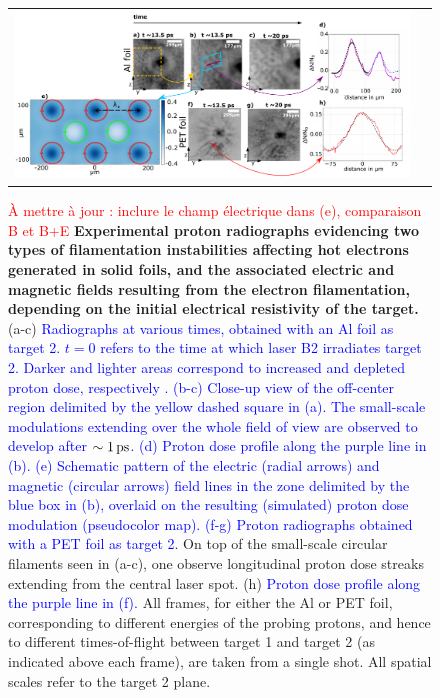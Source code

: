\documentclass[aps,twocolumn,showpacs,superscriptaddress]{revtex4}
\begin{document}
\begin{figure}[tbh!]
\begin{tabular}{cc}
\includegraphics[scale = 0.6]{panel_v5.pdf}
\end{tabular}
 \caption{\label{fig:radio} 
\textcolor{red}{\`A mettre \`a jour : inclure le champ \'electrique dans (e),  comparaison B et B+E}
\textbf{Experimental proton radiographs evidencing two types of filamentation instabilities affecting hot electrons generated in solid foils, and the associated electric and magnetic fields resulting from the electron filamentation, depending on the initial electrical resistivity of the target.}
(a-c) \textcolor{blue}{Radiographs at various times, obtained with an Al foil as target 2. $t=0$ refers to the time at which laser B2 irradiates target 2. Darker and lighter areas correspond to increased and depleted proton dose, respectively \cite{RSI_Albertazzi_2015}. 
(b-c) Close-up view of the off-center region delimited by the yellow dashed square in (a). The small-scale modulations extending over the whole field of view are observed to develop after $\sim 1\,\rm ps$.
(d) Proton dose profile along the purple line in (b).
(e) Schematic pattern of the electric (radial arrows) and magnetic (circular arrows) field lines in the zone delimited by the blue box in (b), overlaid on the resulting (simulated) proton dose modulation (pseudocolor map). 
(f-g) Proton radiographs obtained with a PET foil as target 2}. On top of the small-scale circular filaments seen in (a-c), one observe longitudinal proton dose streaks extending from the central laser spot. 
(h) \textcolor{blue}{Proton dose profile along the purple line in (f).}
All frames, for either the Al or PET foil, corresponding to different energies of the probing protons, and hence to different times-of-flight between target 1 and target 2 (as indicated above each frame), are taken from a single shot. All spatial scales refer to the target 2 plane.
}
\end{figure}
\end{document}
